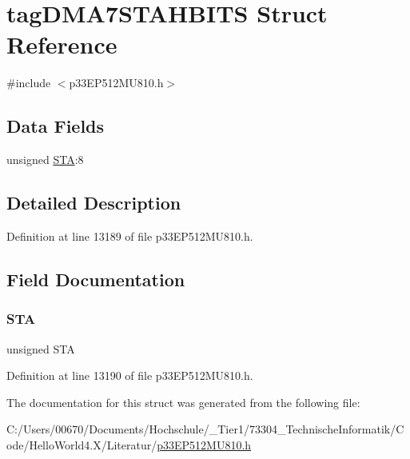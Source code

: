 \hypertarget{structtag_d_m_a7_s_t_a_h_b_i_t_s}{}\section{tag\+D\+M\+A7\+S\+T\+A\+H\+B\+I\+TS Struct Reference}
\label{structtag_d_m_a7_s_t_a_h_b_i_t_s}


{\ttfamily \#include $<$p33\+E\+P512\+M\+U810.\+h$>$}

\subsection*{Data Fields}
\begin{DoxyCompactItemize}
\item 
unsigned \hyperlink{structtag_d_m_a7_s_t_a_h_b_i_t_s_a0eec78ddd2c12af678d5fab70fe62d14}{S\+TA}\+:8
\end{DoxyCompactItemize}


\subsection{Detailed Description}


Definition at line 13189 of file p33\+E\+P512\+M\+U810.\+h.



\subsection{Field Documentation}
\mbox{\label{structtag_d_m_a7_s_t_a_h_b_i_t_s_a0eec78ddd2c12af678d5fab70fe62d14}} 
\subsubsection{\texorpdfstring{S\+TA}{STA}}
{\footnotesize\ttfamily unsigned S\+TA}



Definition at line 13190 of file p33\+E\+P512\+M\+U810.\+h.



The documentation for this struct was generated from the following file\+:\begin{DoxyCompactItemize}
\item 
C\+:/\+Users/00670/\+Documents/\+Hochschule/\+\_\+\+Tier1/73304\+\_\+\+Technische\+Informatik/\+Code/\+Hello\+World4.\+X/\+Literatur/\hyperlink{p33_e_p512_m_u810_8h}{p33\+E\+P512\+M\+U810.\+h}\end{DoxyCompactItemize}
